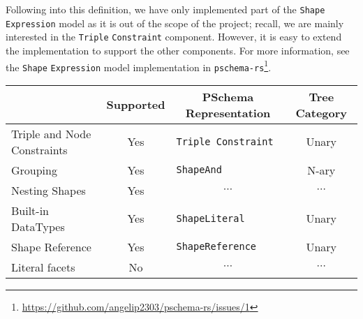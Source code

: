 Following into this definition, we have only implemented part of the \texttt{Shape} \texttt{Expression} model as it is out of the scope of the project; recall, we are mainly interested in the \texttt{Triple} \texttt{Constraint} component. However, it is easy to extend the implementation to support the other components. For more information, see the \texttt{Shape} \texttt{Expression} model implementation in \texttt{pschema-rs}\footnote{\url{https://github.com/angelip2303/pschema-rs/issues/1}}.

\begin{table}[ht]
    \centering
    \begin{tabular}{|l|c|l|c|}
        \hline
        \rowcolor[HTML]{C0C0C0}
        \multicolumn{1}{|c|}{\cellcolor[HTML]{C0C0C0}\textbf{Feature}} & \textbf{Supported}         & \multicolumn{1}{c|}{\cellcolor[HTML]{C0C0C0}\textbf{PSchema Representation}} & \multicolumn{1}{c|}{\cellcolor[HTML]{C0C0C0}\textbf{Tree Category}} \\ \hline
        Triple and Node Constraints                                    & {\color[HTML]{009901} Yes} & \texttt{Triple Constraint}                                                   & Unary                                                               \\ \hline
        Grouping                                                       & {\color[HTML]{009901} Yes} & \texttt{ShapeAnd}                                                            & N-ary                                                               \\ \hline
        Nesting Shapes                                                 & {\color[HTML]{009901} Yes} & \multicolumn{1}{c|}{$\cdots$}                                                & \multicolumn{1}{c|}{$\cdots$}                                       \\ \hline
        Built-in DataTypes                                             & {\color[HTML]{009901} Yes} & \texttt{ShapeLiteral}                                                        & Unary                                                               \\ \hline
        Shape Reference                                                & {\color[HTML]{009901} Yes} & \texttt{ShapeReference}                                                      & Unary                                                               \\ \hline
        Literal facets                                                 & {\color[HTML]{FE0000} No}  & \multicolumn{1}{c|}{$\cdots$}                                                & \multicolumn{1}{c|}{$\cdots$}                                       \\ \hline

\end{tabular}
\end{table}
